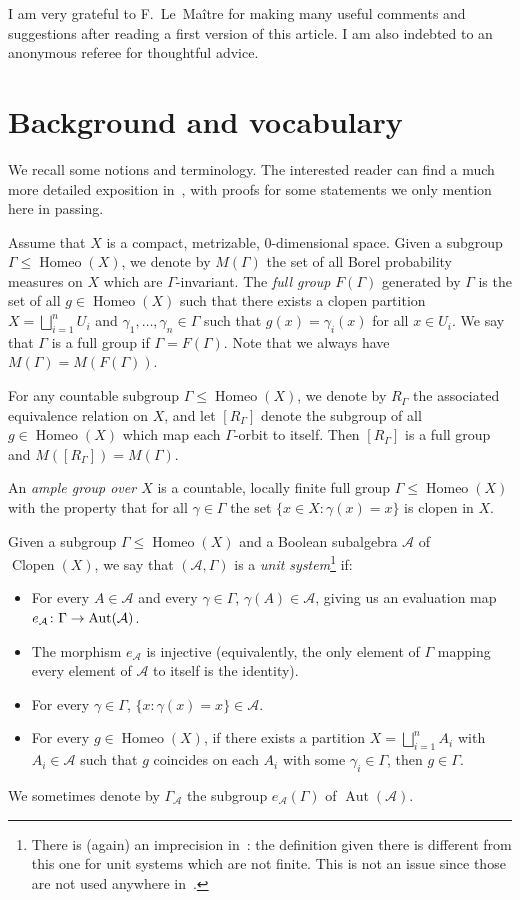 \documentclass[AHL,Unicode]{cedram}
\DeclareMathOperator{\Homeo}{Homeo}
\DeclareMathOperator{\Clopen}{Clopen}
\DeclareMathOperator{\Aut}{Aut}
\newcommand{\mcA}{\mathcal{A}}
\renewcommand*{\to}{\mathchoice{\longrightarrow}{\rightarrow}{\rightarrow}{\rightarrow}}
\begin{document}
I am very grateful to F.~Le~Maître for making many useful comments and suggestions after reading a first version of this article. I am also indebted to an anonymous referee for thoughtful advice.

\section{Background and vocabulary}

We recall some notions and terminology. The interested reader can find a much more detailed exposition in~\cite{Melleray2023}, with proofs for some statements we only mention here in passing.

Assume that $X$ is a compact, metrizable, $0$-dimensional space. Given a subgroup $\Gamma \le \Homeo(X)$, we denote by $M(\Gamma)$ the set of all Borel probability measures on $X$ which are $\Gamma$-invariant. The \emph{full group} $F(\Gamma)$ generated by $\Gamma$ is the set of all $g \in \Homeo(X)$ such that there exists a clopen partition $X= \bigsqcup_{i=1}^n U_i$ and $\gamma_1,\dots,\gamma_n \in \Gamma$ such that $g(x)=\gamma_i(x)$ for all $x \in U_i$. We say that $\Gamma$ is a full group if $\Gamma=F(\Gamma)$. Note that we always have $M(\Gamma)=M(F(\Gamma))$.

For any countable subgroup $\Gamma \le \Homeo(X)$, we denote by $R_\Gamma$ the associated equivalence relation on $X$, and let $[R_\Gamma]$ denote the subgroup of all $g \in \Homeo(X)$ which map each $\Gamma$-orbit to itself. Then $[R_\Gamma]$ is a full group and $M([R_\Gamma])=M(\Gamma)$.

An \emph{ample group over $X$} is a countable, locally finite full group $\Gamma \le \Homeo(X)$ with the property that for all $\gamma \in \Gamma$ the set $\{ x \in X : \gamma(x)=x \}$ is clopen in $X$.

Given a subgroup $\Gamma \le \Homeo(X)$ and a Boolean subalgebra $\mcA$ of $\Clopen(X)$, we say that $(\mcA,\Gamma)$ is a \emph{unit system}\footnote{There is (again) an imprecision in~\cite{Melleray2023}: the definition given there is different from this one for unit systems which are not finite. This is not an issue since those are not used anywhere in~\cite{Melleray2023}.} if:
\begin{itemize}
\item For every $A \in \mcA$ and every $\gamma \in \Gamma$, $\gamma(A) \in \mcA$, giving us an evaluation map $e_\mcA \colon \Gamma \to \Aut(\mcA)$.
\item The morphism $e_\mcA$ is injective (equivalently, the only element of $\Gamma$ mapping every element of $\mcA$ to itself is the identity).
\item For every $\gamma \in \Gamma$, $\{x : \gamma(x)= x \} \in \mcA$.
\item For every $g \in \Homeo(X)$, if there exists a partition $X=\bigsqcup_{i=1}^n A_i$ with $A_i \in \mcA$ such that $g$ coincides on each $A_i$ with some $\gamma_i \in \Gamma$, then $g \in \Gamma$.
\end{itemize}
We sometimes denote by $\Gamma_\mcA$ the subgroup $e_\mcA(\Gamma)$ of $\Aut(\mcA)$.
\end{document}
